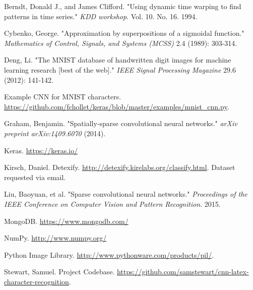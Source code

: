 \begin{thebibliography}{100}

 Berndt, Donald J., and James Clifford. "Using dynamic time warping to find patterns in time series." \textit{KDD workshop}. Vol. 10. No. 16. 1994.

 Cybenko, George. "Approximation by superpositions of a sigmoidal function." \textit{Mathematics of Control, Signals, and Systems (MCSS)} 2.4 (1989): 303-314.

 Deng, Li. "The MNIST database of handwritten digit images for machine learning research [best of the web]." \textit{IEEE Signal Processing Magazine} 29.6 (2012): 141-142.

 Example CNN for MNIST characters. \url{https://github.com/fchollet/keras/blob/master/examples/mnist_cnn.py}.

 Graham, Benjamin. "Spatially-sparse convolutional neural networks." \textit{arXiv preprint arXiv:1409.6070} (2014).

 Keras. \url{https://keras.io/}

 Kirsch, Daniel. Detexify. \url{http://detexify.kirelabs.org/classify.html}. Dataset requested via email.

 Liu, Baoyuan, et al. "Sparse convolutional neural networks." \textit{Proceedings of the IEEE Conference on Computer Vision and Pattern Recognition}. 2015.

 MongoDB. \url{https://www.mongodb.com/}

 NumPy. \url{http://www.numpy.org/}

 Python Image Library. \url{http://www.pythonware.com/products/pil/}.

 Stewart, Samuel. Project Codebase. \url{https://github.com/samstewart/cnn-latex-character-recognition}.


\end{thebibliography}

\newpage{\pagestyle{empty}\cleardoublepage}